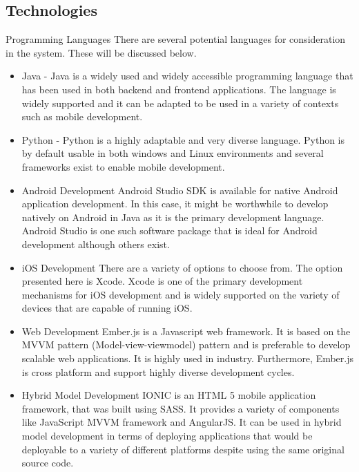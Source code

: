 \documentclass[12pt]{article}
\begin{document}
\subsection{Technologies}
Programming Languages
There are several potential languages for consideration in the system. These will be discussed below.
\begin{itemize}
\item Java - Java is a widely used and widely accessible programming language that has been used in both backend and frontend applications. The language is widely supported and it can be adapted to be used in a variety of contexts such as mobile development.
\item Python - Python is a highly adaptable and very diverse language. Python is by default usable in both windows and Linux environments and several frameworks exist to enable mobile development.
\end{itemize}
\begin{itemize}
\item Android Development
Android Studio SDK is available for native Android application development. In this case, it might be worthwhile to develop natively on Android in Java as it is the primary development language. Android Studio is one such software package that is ideal for Android development although others exist.

\item iOS Development
There are a variety of options to choose from. The option presented here is Xcode. Xcode is one of the primary development mechanisms for iOS development and is widely supported on the variety of devices that are capable of running iOS. 

\item Web Development
Ember.js is a Javascript web framework. It is based on the MVVM pattern (Model-view-viewmodel) pattern and is preferable to develop scalable web applications. It is highly used in industry. Furthermore, Ember.js is cross platform and support highly diverse development cycles.

\item Hybrid Model Development
IONIC is an HTML 5 mobile application framework, that was built using SASS. It provides a variety of components like JavaScript MVVM framework and AngularJS. It can be used in hybrid model development in terms of deploying applications that would be deployable to a variety of different platforms despite using the same original source code.

\end{itemize}
\end{document}
